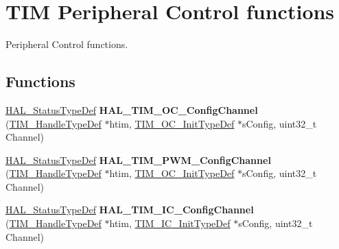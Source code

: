 \hypertarget{group___t_i_m___exported___functions___group8}{}\section{T\+IM Peripheral Control functions}
\label{group___t_i_m___exported___functions___group8}


Peripheral Control functions.  


\subsection*{Functions}
\begin{DoxyCompactItemize}
\item 
\mbox{\label{group___t_i_m___exported___functions___group8_ga6e22dfc93b7569da087a115348c3182f}} 
\mbox{\hyperlink{stm32f7xx__hal__def_8h_a63c0679d1cb8b8c684fbb0632743478f}{H\+A\+L\+\_\+\+Status\+Type\+Def}} {\bfseries H\+A\+L\+\_\+\+T\+I\+M\+\_\+\+O\+C\+\_\+\+Config\+Channel} (\mbox{\hyperlink{struct_t_i_m___handle_type_def}{T\+I\+M\+\_\+\+Handle\+Type\+Def}} $\ast$htim, \mbox{\hyperlink{struct_t_i_m___o_c___init_type_def}{T\+I\+M\+\_\+\+O\+C\+\_\+\+Init\+Type\+Def}} $\ast$s\+Config, uint32\+\_\+t Channel)
\item 
\mbox{\label{group___t_i_m___exported___functions___group8_gac14a4959f65f51a54e8ff511242e2131}} 
\mbox{\hyperlink{stm32f7xx__hal__def_8h_a63c0679d1cb8b8c684fbb0632743478f}{H\+A\+L\+\_\+\+Status\+Type\+Def}} {\bfseries H\+A\+L\+\_\+\+T\+I\+M\+\_\+\+P\+W\+M\+\_\+\+Config\+Channel} (\mbox{\hyperlink{struct_t_i_m___handle_type_def}{T\+I\+M\+\_\+\+Handle\+Type\+Def}} $\ast$htim, \mbox{\hyperlink{struct_t_i_m___o_c___init_type_def}{T\+I\+M\+\_\+\+O\+C\+\_\+\+Init\+Type\+Def}} $\ast$s\+Config, uint32\+\_\+t Channel)
\item 
\mbox{\label{group___t_i_m___exported___functions___group8_ga34805dabaf748c6eb823275dad2f19f5}} 
\mbox{\hyperlink{stm32f7xx__hal__def_8h_a63c0679d1cb8b8c684fbb0632743478f}{H\+A\+L\+\_\+\+Status\+Type\+Def}} {\bfseries H\+A\+L\+\_\+\+T\+I\+M\+\_\+\+I\+C\+\_\+\+Config\+Channel} (\mbox{\hyperlink{struct_t_i_m___handle_type_def}{T\+I\+M\+\_\+\+Handle\+Type\+Def}} $\ast$htim, \mbox{\hyperlink{struct_t_i_m___i_c___init_type_def}{T\+I\+M\+\_\+\+I\+C\+\_\+\+Init\+Type\+Def}} $\ast$s\+Config, uint32\+\_\+t Channel)

\end{DoxyCompactItemize}
